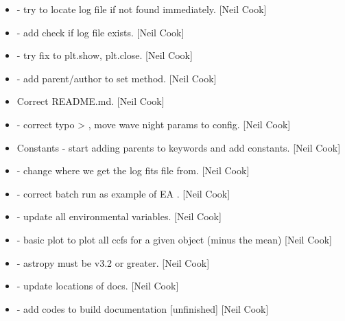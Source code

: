 \documentclass[a4paper,10pt,english]{report}
\begin{document}
\begin{itemize}
\item {} 
 - try to locate log file if not
found immediately. {[}Neil Cook{]}

\item {} 
 - add check if log file exists.
{[}Neil Cook{]}

\item {} 
 - try fix to plt.show, plt.close. {[}Neil Cook{]}

\item {} 
 - add parent/author to set
method. {[}Neil Cook{]}

\item {} 
Correct README.md. {[}Neil Cook{]}

\item {} 
 - correct typo  \textendash{}\textgreater{} , move
wave night params to config. {[}Neil Cook{]}

\item {} 
Constants - start adding parents to keywords and add 
constants. {[}Neil Cook{]}

\item {} 
 - change where we get the log
fits file from. {[}Neil Cook{]}

\item {} 
 - correct batch run as example of
EA . {[}Neil Cook{]}

\item {} 
 - update all environmental variables. {[}Neil
Cook{]}

\item {} 
 - basic plot to plot all ccfs for a given
object (minus the mean) {[}Neil Cook{]}

\item {} 
 - astropy must be v3.2 or greater. {[}Neil Cook{]}

\item {} 
 - update locations of docs. {[}Neil
Cook{]}

\item {} 
 - add codes to build
documentation {[}unfinished{]} {[}Neil Cook{]}


\end{itemize}
\end{document}
